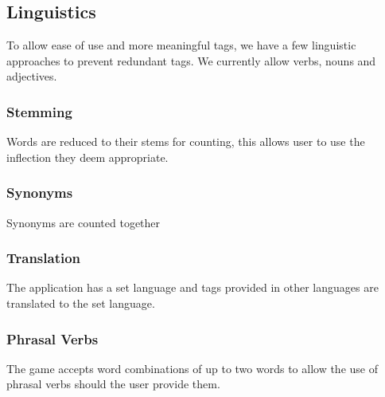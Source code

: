 \subsection{Linguistics}

To allow ease of use and more meaningful tags, we have a few linguistic approaches to prevent redundant tags. We currently allow verbs, nouns and adjectives.



\subsubsection{Stemming}
Words are reduced to their stems for counting, this allows user to use the inflection they deem appropriate.


\subsubsection{Synonyms}
Synonyms are counted together


\subsubsection{Translation}
The application has a set language and tags provided in other languages are translated to the set language.


\subsubsection{Phrasal Verbs}
The game accepts word combinations of up to two words to allow the use of phrasal verbs should the user provide them.


